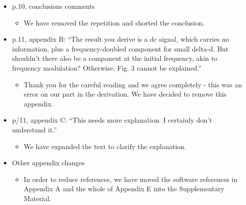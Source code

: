 \documentclass[a4paper, 10pt]{letter}
\begin{document}
\begin{itemize}
\item p.10, conclusions comments
\begin{itemize}
\item We have removed the repetition and shorted the conclusion. 
\end{itemize}

\item p.11, appendix B: ``The result you derive is a dc signal, which carries no information, plus a frequency-doubled component for small delta-d. But shouldn't there also be a component at the initial frequency, akin to frequency modulation? Otherwise, Fig. 3 cannot be explained.''
\begin{itemize}
\item Thank you for the careful reading and we agree completely - this was an error on our part in the derivation. We have decided to remove this appendix. 
\end{itemize}

\item p/11, appendix C: ``This needs more explanation. I certainly don't understand it.''
\begin{itemize}
\item We have expanded the text to clarify the explanation. 
\end{itemize}

\item Other appendix changes
\begin{itemize}
\item In order to reduce references, we have moved the software references in Appendix A and the whole of Appendix E into the Supplementary Material. 
\end{itemize}

\end{itemize}
\end{document}
